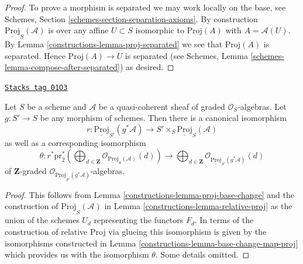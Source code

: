 \begin{proof}

To prove a morphism is separated we may work locally on the base,
see Schemes, Section \ref{schemes-section-separation-axioms}.
By construction $\underline{\text{Proj}}_S(\mathcal{A})$ is
over any affine $U \subset S$ isomorphic to
$\text{Proj}(A)$ with $A = \mathcal{A}(U)$. By
Lemma \ref{constructions-lemma-proj-separated} we see that $\text{Proj}(A)$ is separated.
Hence $\text{Proj}(A) \to U$ is separated (see
Schemes, Lemma \ref{schemes-lemma-compose-after-separated}) as desired.
\end{proof}

\begin{lemma}
\label{constructions-lemma-relative-proj-base-change}
\href{https://stacks.math.columbia.edu/tag/01O3}{\texttt{Stacks tag 01O3}}

Let $S$ be a scheme and $\mathcal{A}$ be a quasi-coherent sheaf
of graded $\mathcal{O}_S$-algebras. Let $g : S' \to S$ be any morphism
of schemes. Then there is a canonical isomorphism
$$
r :
\underline{\text{Proj}}_{S'}(g^*\mathcal{A})
\longrightarrow
S' \times_S \underline{\text{Proj}}_S(\mathcal{A})
$$
as well as a corresponding isomorphism
$$
\theta :
r^*\text{pr}_2^*\left(\bigoplus\nolimits_{d \in \mathbf{Z}}
\mathcal{O}_{\underline{\text{Proj}}_S(\mathcal{A})}(d)\right)
\longrightarrow
\bigoplus\nolimits_{d \in \mathbf{Z}}
\mathcal{O}_{\underline{\text{Proj}}_{S'}(g^*\mathcal{A})}(d)
$$
of $\mathbf{Z}$-graded
$\mathcal{O}_{\underline{\text{Proj}}_{S'}(g^*\mathcal{A})}$-algebras.
\end{lemma}

\begin{proof}

This follows from Lemma \ref{constructions-lemma-proj-base-change} and the construction
of $\underline{\text{Proj}}_S(\mathcal{A})$ in
Lemma \ref{constructions-lemma-relative-proj} as the union
of the schemes $U_d$ representing the functors $F_d$.
In terms of the construction of relative Proj via glueing
this isomorphism is given by the isomorphisms constructed
in Lemma \ref{constructions-lemma-base-change-map-proj} which provides us with
the isomorphism $\theta$. Some details omitted.
\end{proof}

